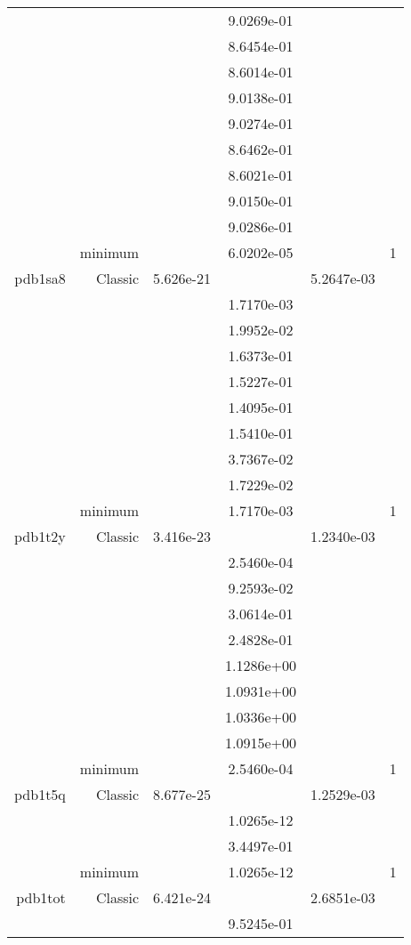 \begin{xltabular}{\textwidth}{r|rS[table-format=1.3e+2]S[table-format=1.4e+2]S[table-format=1.4e+2]S[table-format=-1.5]}
&  &  & 9.0269e-01 & & \\
&  &  & 8.6454e-01 & & \\
&  &  & 8.6014e-01 & & \\
&  &  & 9.0138e-01 & & \\
&  &  & 9.0274e-01 & & \\
&  &  & 8.6462e-01 & & \\
&  &  & 8.6021e-01 & & \\
&  &  & 9.0150e-01 & & \\
&  &  & 9.0286e-01 & & \\
& minimum &  & 6.0202e-05 & & 1 \\  \addlinespace
pdb1sa8 & Classic & 5.626e-21 &  & 5.2647e-03 & \\
&  &  & 1.7170e-03 & & \\
&  &  & 1.9952e-02 & & \\
&  &  & 1.6373e-01 & & \\
&  &  & 1.5227e-01 & & \\
&  &  & 1.4095e-01 & & \\
&  &  & 1.5410e-01 & & \\
&  &  & 3.7367e-02 & & \\
&  &  & 1.7229e-02 & & \\
& minimum &  & 1.7170e-03 & & 1 \\  \addlinespace
pdb1t2y & Classic & 3.416e-23 &  & 1.2340e-03 & \\
&  &  & 2.5460e-04 & & \\
&  &  & 9.2593e-02 & & \\
&  &  & 3.0614e-01 & & \\
&  &  & 2.4828e-01 & & \\
&  &  & 1.1286e+00 & & \\
&  &  & 1.0931e+00 & & \\
&  &  & 1.0336e+00 & & \\
&  &  & 1.0915e+00 & & \\
& minimum &  & 2.5460e-04 & & 1 \\  \addlinespace
pdb1t5q & Classic & 8.677e-25 &  & 1.2529e-03 & \\
&  &  & 1.0265e-12 & & \\
&  &  & 3.4497e-01 & & \\
& minimum &  & 1.0265e-12 & & 1 \\  \addlinespace
pdb1tot & Classic & 6.421e-24 &  & 2.6851e-03 & \\
&  &  & 9.5245e-01 & & \\

\end{xltabular}
